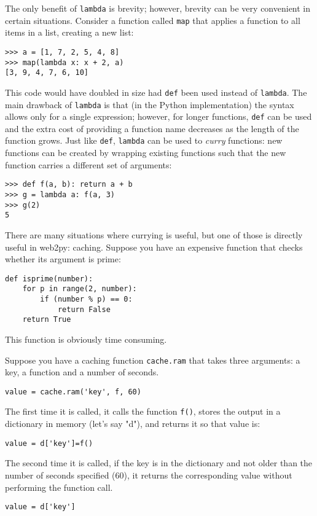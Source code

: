 \documentclass[justified,sixbynine,notoc]{tufte-book}
\def\ft{\small\tt}
\begin{document}
\begin{fullwidth}
The only benefit of {\ft lambda} is brevity; however, brevity can be very convenient in certain situations.  Consider a function called {\ft map} that applies a function to all items in a list, creating a new list:
\begin{lstlisting}
>>> a = [1, 7, 2, 5, 4, 8]
>>> map(lambda x: x + 2, a)
[3, 9, 4, 7, 6, 10]
\end{lstlisting}
This code would have doubled in size had {\ft def} been used instead of {\ft lambda}. The main drawback of {\ft lambda} is that (in the Python implementation) the syntax allows only for a single expression; however, for longer functions, {\ft def} can be used and the extra cost of providing a function name decreases as the length of the function grows.
Just like {\ft def}, {\ft lambda} can be used to {\it curry} functions: new functions can be created by wrapping existing functions such that the new function carries a different set of arguments:
\begin{lstlisting}
>>> def f(a, b): return a + b
>>> g = lambda a: f(a, 3)
>>> g(2)
5
\end{lstlisting}

There are many situations where currying is useful, but one of those is directly useful in web2py: caching. Suppose you have an expensive function that checks whether its argument is prime:
\begin{lstlisting}
def isprime(number):
    for p in range(2, number):
        if (number % p) == 0:
            return False
    return True
\end{lstlisting}

This function is obviously time consuming.

Suppose you have a caching function {\ft cache.ram} that takes three arguments: a key, a function and a number of seconds.
\begin{lstlisting}
value = cache.ram('key', f, 60)
\end{lstlisting}

The first time it is called, it calls the function {\ft f()}, stores the output in a dictionary in memory (let's say "d"), and returns it so that value is:
\begin{lstlisting}
value = d['key']=f()
\end{lstlisting}

The second time it is called, if the key is in the dictionary and not older than the number of seconds specified (60), it returns the corresponding value without performing the function call.
\begin{lstlisting}
value = d['key']
\end{lstlisting}


\end{fullwidth}
\end{document}

